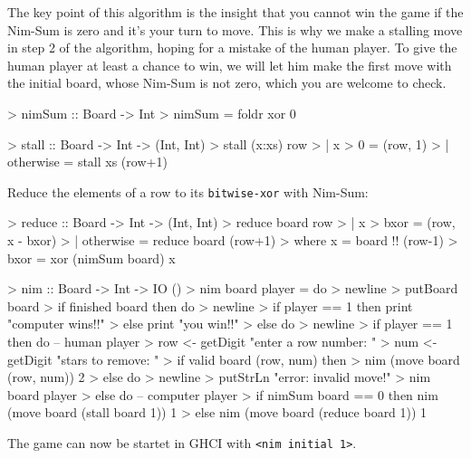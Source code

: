 The key point of this algorithm is the insight that you cannot win the game if the Nim-Sum is zero and it's your turn to move.
This is why we make a stalling move in step 2 of the algorithm, hoping for a mistake of the human player.
To give the human player at least a chance to win, we will let him make the first move with the initial board, whose Nim-Sum is not zero, which you are welcome to check.

\begin{impl}
\end{impl}
\begin{haskellcode}

> nimSum :: Board -> Int
> nimSum = foldr xor 0

\end{haskellcode}

\begin{impl}
\end{impl}
\begin{haskellcode}

> stall :: Board -> Int -> (Int, Int)
> stall (x:xs) row
>     | x > 0 = (row, 1)
>     | otherwise = stall xs (row+1)

\end{haskellcode}

\begin{impl}[Steps 3 - 5]
Reduce the elements of a row to its \texttt{bitwise-xor} with Nim-Sum:
\end{impl}
\begin{haskellcode}

> reduce :: Board -> Int -> (Int, Int)
> reduce board row
>     | x > bxor = (row, x - bxor)
>     | otherwise = reduce board (row+1)
>     where x = board !! (row-1)
>           bxor = xor (nimSum board) x

\end{haskellcode}

\begin{impl}
\end{impl}
\begin{haskellcode}

> nim :: Board -> Int -> IO ()
> nim board player = do
>     newline
>     putBoard board
>     if finished board then do 
>         newline
>         if player == 1 then print "computer wins!!"
>         else print "you win!!"
>     else do
>         newline
>         if player == 1 then do -- human player
>             row <- getDigit "enter a row number: "
>             num <- getDigit "stars to remove: "
>             if valid board (row, num) then
>                 nim (move board (row, num)) 2
>             else do
>                 newline
>                 putStrLn "error: invalid move!"
>                 nim board player
>         else do -- computer player
>             if nimSum board == 0 then nim (move board (stall board 1)) 1
>             else nim (move board (reduce board 1)) 1

\end{haskellcode}

The game can now be startet in GHCI with \texttt{<nim initial 1>}.
